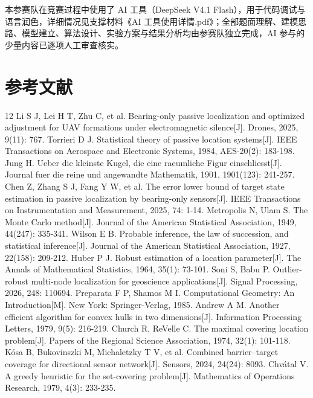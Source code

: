 \documentclass[12pt,a4paper]{ctexart}
\begin{document}
本参赛队在竞赛过程中使用了 AI 工具（DeepSeek V4.1 Flash），用于代码调试与语言润色，详细情况见支撑材料《AI 工具使用详情.pdf》；全部题面理解、建模思路、模型建立、算法设计、实验方案与结果分析均由参赛队独立完成，AI 参与的少量内容已逐项人工审查核实。

\section*{参考文献}
\renewcommand{\refname}{}
\begin{thebibliography}{12}
\setlength{\itemsep}{0pt}
\setlength{\parsep}{0pt}
\setlength{\topsep}{2pt}
 Li S J, Lei H T, Zhu C, et al. Bearing-only passive localization and optimized adjustment for UAV formations under electromagnetic silence[J]. Drones, 2025, 9(11): 767.
 Torrieri D J. Statistical theory of passive location systems[J]. IEEE Transactions on Aerospace and Electronic Systems, 1984, AES-20(2): 183-198.
 Jung H. Ueber die kleinste Kugel, die eine raeumliche Figur einschliesst[J]. Journal fuer die reine und angewandte Mathematik, 1901, 1901(123): 241-257.
 Chen Z, Zhang S J, Fang Y W, et al. The error lower bound of target state estimation in passive localization by bearing-only sensors[J]. IEEE Transactions on Instrumentation and Measurement, 2025, 74: 1-14.
 Metropolis N, Ulam S. The Monte Carlo method[J]. Journal of the American Statistical Association, 1949, 44(247): 335-341.
 Wilson E B. Probable inference, the law of succession, and statistical inference[J]. Journal of the American Statistical Association, 1927, 22(158): 209-212.
 Huber P J. Robust estimation of a location parameter[J]. The Annals of Mathematical Statistics, 1964, 35(1): 73-101.
 Soni S, Babu P. Outlier-robust multi-node localization for geoscience applications[J]. Signal Processing, 2026, 248: 110694.
 Preparata F P, Shamos M I. Computational Geometry: An Introduction[M]. New York: Springer-Verlag, 1985.
 Andrew A M. Another efficient algorithm for convex hulls in two dimensions[J]. Information Processing Letters, 1979, 9(5): 216-219.
 Church R, ReVelle C. The maximal covering location problem[J]. Papers of the Regional Science Association, 1974, 32(1): 101-118.
 K\'osa B, Bukovinszki M, Michaletzky T V, et al. Combined barrier--target coverage for directional sensor network[J]. Sensors, 2024, 24(24): 8093.
 Chv\'atal V. A greedy heuristic for the set-covering problem[J]. Mathematics of Operations Research, 1979, 4(3): 233-235.

\end{thebibliography}
\end{document}
